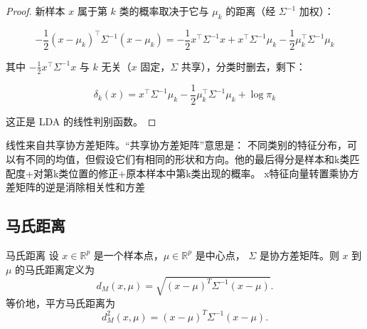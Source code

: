 \begin{proof}
    新样本 $x$ 属于第 $k$ 类的概率取决于它与 $\mu_k$ 的距离（经 $\Sigma^{-1}$ 加权）：

\[
-\frac{1}{2}(x - \mu_k)^\top \Sigma^{-1} (x - \mu_k)
= -\frac{1}{2}x^\top \Sigma^{-1} x + x^\top \Sigma^{-1} \mu_k - \frac{1}{2}\mu_k^\top \Sigma^{-1} \mu_k
\]

其中 $-\frac{1}{2}x^\top \Sigma^{-1} x$ 与 $k$ 无关（$x$ 固定，$\Sigma$ 共享），分类时删去，剩下：

\[
\delta_k(x) = x^\top \Sigma^{-1} \mu_k - \frac{1}{2}\mu_k^\top \Sigma^{-1} \mu_k + \log \pi_k
\]

这正是 LDA 的线性判别函数。
\end{proof}
\begin{dxtips}
    线性来自共享协方差矩阵。“共享协方差矩阵”意思是：
不同类别的特征分布，可以有不同的均值，但假设它们有相同的形状和方向。他的最后得分是样本和k类匹配度+对第k类位置的修正+原本样本中第k类出现的概率。
x特征向量转置乘协方差矩阵的逆是消除相关性和方差
\end{dxtips}
\subsection{马氏距离}
\begin{definition}{马氏距离}
设 \(x\in\mathbb{R}^p\) 是一个样本点，\(\mu\in\mathbb{R}^p\) 是中心点，
\(\Sigma\) 是协方差矩阵。则 \(x\) 到 \(\mu\) 的马氏距离定义为
\[
d_M(x,\mu)
=
\sqrt{(x-\mu)^T\Sigma^{-1}(x-\mu)}.
\]
等价地，平方马氏距离为
\[
d_M^2(x,\mu)
=
(x-\mu)^T\Sigma^{-1}(x-\mu).
\]
\end{definition}

